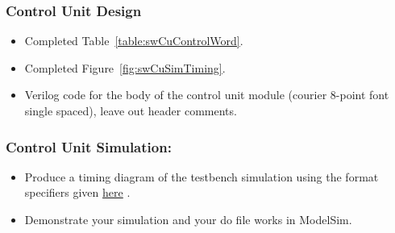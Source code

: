 \subsubsection{Control Unit Design}

\begin{itemize}
\item
  Completed Table~\ref{table:swCuControlWord}.
\item
  Completed Figure~\ref{fig:swCuSimTiming}.
\item
  Verilog code for the body of the control unit module (courier 8-point
  font single spaced), leave out header comments.
\end{itemize}

\subsubsection{Control Unit Simulation:}

\begin{itemize}
\item
  Produce a timing diagram of the testbench simulation using the
  format specifiers given \hyperlink{swCuWaveform}{here} .
\end{itemize}

\begin{itemize}
\item
  Demonstrate your simulation and your do file works in ModelSim.
\end{itemize}

